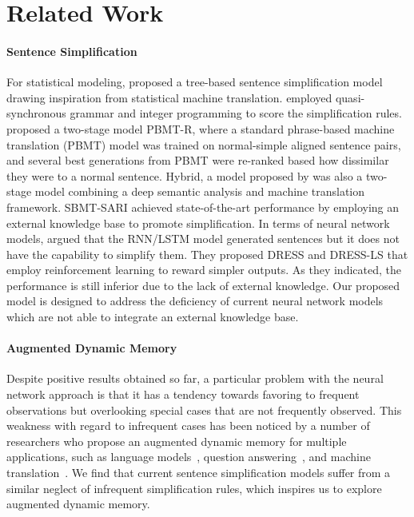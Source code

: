\documentclass[11pt,a4paper]{article}
\begin{document}
\section{Related Work}

\paragraph{Sentence Simplification}

For statistical modeling, \citet{zhu2010monolingual} proposed a tree-based sentence simplification model drawing inspiration from statistical machine translation. \citet{woodsend2011learning} employed quasi-synchronous grammar and integer programming to score the simplification rules. \citet{wubben2012sentence} proposed a two-stage model PBMT-R, where a standard phrase-based machine translation (PBMT) model was trained on normal-simple aligned sentence pairs, and several best generations from PBMT were re-ranked based how dissimilar they were to a normal sentence. Hybrid, a model proposed by \citet{narayan2014hybrid} was also a two-stage model combining a deep semantic analysis and machine translation framework. 
SBMT-SARI \cite{xu2016optimizing} achieved state-of-the-art performance by employing an external knowledge base to promote simplification.
In terms of neural network models, \citet{zhang2017sentence} argued that the RNN/LSTM model generated sentences but it does not have the capability to simplify them. They proposed DRESS and DRESS-LS that employ reinforcement learning to reward simpler outputs. As they indicated, the performance is still inferior due to the lack of external knowledge.
Our proposed model is designed to address the deficiency of current neural network models which are not able to integrate an external knowledge base.

\paragraph{Augmented Dynamic Memory}

Despite positive results obtained so far, a particular problem with the neural network approach is that it has a tendency towards favoring to frequent observations but overlooking special cases that are not frequently observed. This weakness with regard to infrequent cases has been noticed by a number of researchers who propose an augmented dynamic memory for multiple applications, such as language models~\cite{daniluk2017frustratingly, grave2016improving}, question answering~\cite{miller2016key}, and machine translation~\cite{feng2017memory, tu2017learning}. We find that current sentence simplification models suffer from a similar neglect of infrequent simplification rules, which inspires us to explore augmented dynamic memory.
\end{document}

